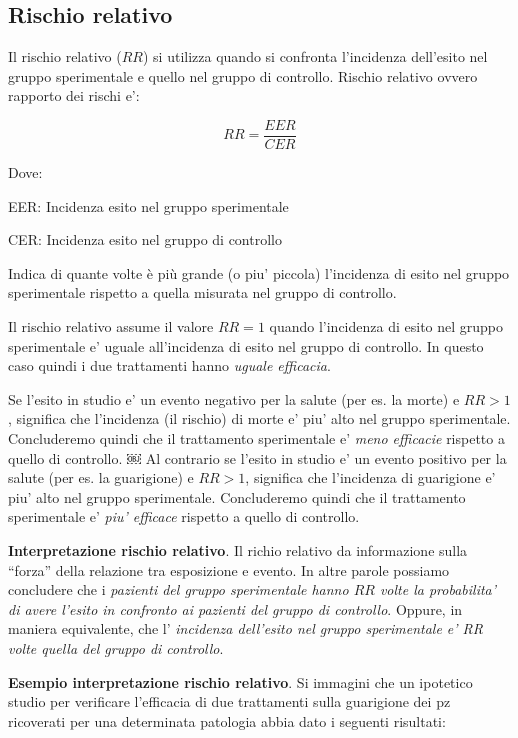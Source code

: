 \documentclass[]{book}
\begin{document}
\hypertarget{rischio-relativo}{%
\subsection{Rischio relativo}\label{rischio-relativo}}

Il rischio relativo (\(RR\)) si utilizza quando si confronta l'incidenza dell'esito nel gruppo sperimentale e quello nel gruppo di controllo. Rischio relativo ovvero rapporto dei rischi e':

\[ RR = \frac{ EER }{CER}\]

Dove:

EER: Incidenza esito nel gruppo sperimentale

CER: Incidenza esito nel gruppo di controllo

Indica di quante volte è più grande (o piu' piccola) l'incidenza di esito nel gruppo sperimentale rispetto a quella misurata nel gruppo di controllo.

Il rischio relativo assume il valore \(RR=1\) quando l'incidenza di esito nel gruppo sperimentale e' uguale all'incidenza di esito nel gruppo di controllo. In questo caso quindi i due trattamenti hanno \emph{uguale efficacia}.

Se l'esito in studio e' un evento negativo per la salute (per es. la morte) e \(RR>1\), significa che l'incidenza (il rischio) di morte e' piu' alto nel gruppo sperimentale. Concluderemo quindi che il trattamento sperimentale e' \emph{meno efficacie} rispetto a quello di controllo.
￼
Al contrario se l'esito in studio e' un evento positivo per la salute (per es. la guarigione) e \(RR>1\), significa che l'incidenza di guarigione e' piu' alto nel gruppo sperimentale. Concluderemo quindi che il trattamento sperimentale e' \emph{piu' efficace} rispetto a quello di controllo.

\textbf{Interpretazione rischio relativo}. Il richio relativo da informazione sulla ``forza'' della relazione tra esposizione e evento. In altre parole possiamo concludere che i \emph{pazienti del gruppo sperimentale hanno \(RR\) volte la probabilita' di avere l'esito in confronto ai pazienti del gruppo di controllo}. Oppure, in maniera equivalente, che l' \emph{incidenza dell'esito nel gruppo sperimentale e' RR volte quella del gruppo di controllo}.

\textbf{Esempio interpretazione rischio relativo}. Si immagini che un ipotetico studio per verificare l'efficacia di due trattamenti sulla guarigione dei pz ricoverati per una determinata patologia abbia dato i seguenti risultati:
\end{document}
